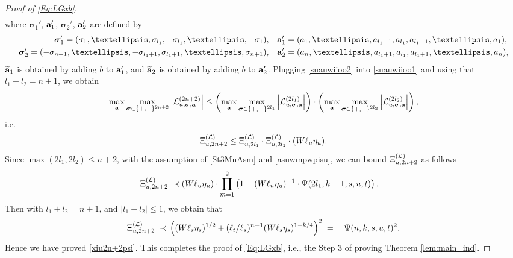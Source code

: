 \documentclass[10pt,reqno]{article}
\newcommand{\wt}{\widetilde}
\newcommand{\ba}{{\bf{a}}}
\theoremstyle{plain} %
\theoremstyle{remark}
\numberwithin{equation}{section}
\begin{document}
\begin{proof}[Proof of \eqref{Eq:LGxb}]
\begin{align}
\end{align}
where $\boldsymbol{\sigma}_1'$, $\ba_1'$, $\boldsymbol{\sigma}_2'$, $\ba_2'$ are defined by  
\begin{align*}
\boldsymbol{\sigma}_1'=(\sigma_1,\ldots,\sigma_{l_1},-\sigma_{l_1},\ldots,-\sigma_1),\quad  &\ba_1'=( a_1 ,\ldots,  a_{l_1-1} , a_{l_1} , a_{l_1-1} ,\ldots,  a_1 ),\\
\boldsymbol{\sigma}_2'=(-\sigma_{n+1},\ldots,-\sigma_{l_1+1},\sigma_{l_1+1},\ldots,\sigma_{n+1}),\quad &\ba_2'=( a_{n} ,\ldots,  a_{l_1+1} , a_{l_1} , a_{l_1+1} ,\ldots,  a_{n} ),
\end{align*}
$\wt\ba_1$ is obtained by adding $ b $ to $\ba_1'$, and $\wt\ba_2$ is obtained by adding $ b $ to $\ba_2'$. Plugging \eqref{suauwiioo2} into \eqref{suauwiioo1} and using that $l_1+l_2=n+1$, we obtain
\begin{align} \label{asu-2w}
   \max_{\ba }\max_{\boldsymbol{\sigma}\in \{+,-\}^{2n+2}}\left|{\cal L}^{(2n+2)}_{u,\boldsymbol{\sigma},\ba}\right|\le 
    \left(\max_{\ba }\max_{\boldsymbol{\sigma}\in \{+,-\}^{2l_1}}\left|{\cal L}^{(2l_1)}_{u,\boldsymbol{\sigma},\ba}\right|\right)\cdot \left(\max_{\ba }\max_{\boldsymbol{\sigma}\in \{+,-\}^{2l_2}}\left|{\cal L}^{(2l_2)}_{u,\boldsymbol{\sigma},\ba}\right|\right), 
\end{align}
i.e.
\begin{align} \label{asuwmpwpisu}
\Xi^{({\cal L})}_{u, 2n+2}\le \Xi^{({\cal L})}_{u, 2l_1}\cdot \Xi^{({\cal L})}_{u, 2l_2}\cdot (W\ell_u\eta_u).
\end{align}  
Since   $\max(2l_1, 2l_2)\le n+2$, with the assumption of \eqref{St3MnAsm} and \eqref{asuwmpwpisu}, we can bound $\Xi^{({\cal L})}_{u, 2n+2}$ as follows
\begin{align}
 \Xi^{({\cal L})}_{u, 2n+2}
\; \prec \; &(W\ell_u\eta_u)\cdot \prod_{m=1}^2\left(1+(W\ell_u\eta_u)^{-1}\cdot \Psi(2l_1, k-1, s,u,t)\right) . 
 \end{align} 
 Then with $l_1+l_2=n+1$, and $|l_1-l_2|\le 1$,  we obtain  that
 \begin{align}
\Xi^{({\cal L})}_{u, 2n+2}\; \prec \; &\left((W\ell_s\eta_s)^{1/2}+(\ell_t/\ell_s)^{n-1}(W\ell_s\eta_s)^{1-k/4}\right)^2
\; = \; &\Psi(n,k,s,u,t)^2.
 \end{align} 
Hence we have proved  \eqref{xiu2n+2psi}. This completes the proof of \eqref{Eq:LGxb}, i.e., the Step 3 of  proving Theorem \ref{lem:main_ind}. 


\end{proof}
\end{document}
